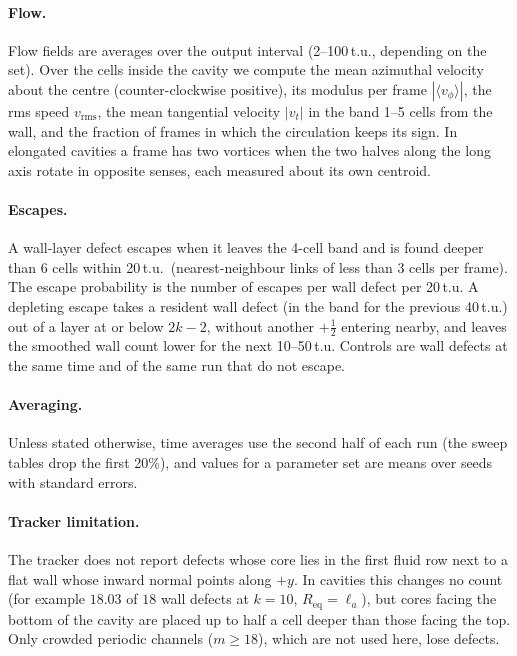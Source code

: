 \documentclass[aps,prl,onecolumn,superscriptaddress,amsmath,amssymb,nofootinbib]{revtex4-2}
\newcommand{\half}{\tfrac12}
\newcommand{\la}{\ell_a}
\begin{document}
\paragraph{Flow.} Flow fields are averages over the output interval (2--100\,t.u., depending on the set). Over the cells inside the cavity we compute the mean
azimuthal velocity about the centre (counter-clockwise positive), its modulus per frame $|\langle v_\phi\rangle|$, the rms speed $v_\mathrm{rms}$, the mean
tangential velocity $|v_t|$ in the band 1--5 cells from the wall, and the fraction of frames in which the circulation keeps its sign. In elongated cavities a frame
has two vortices when the two halves along the long axis rotate in opposite senses, each measured about its own centroid.

\paragraph{Escapes.} A wall-layer defect escapes when it leaves the 4-cell band and is found deeper than 6 cells within 20\,t.u.\ (nearest-neighbour links of less
than 3 cells per frame). The escape probability is the number of escapes per wall defect per 20\,t.u. A depleting escape takes a resident wall defect (in the band for the previous 40\,t.u.) out of a layer at or below
$2k-2$, without another $+\half$ entering nearby, and leaves the smoothed wall count lower for the next 10--50\,t.u. Controls are wall defects at the same time and of the same run that do not escape.

\paragraph{Averaging.} Unless stated otherwise, time averages use the second half of each run (the sweep tables drop the first 20\%), and values for a parameter set
are means over seeds with standard errors.

\paragraph{Tracker limitation.} The tracker does not report defects whose core lies in the first fluid row next to a flat wall whose inward normal points along $+y$.
In cavities this changes no count (for example $18.03$ of $18$ wall defects at $k=10$, $R_\mathrm{eq}=\la$), but cores facing the bottom of the cavity are placed up to
half a cell deeper than those facing the top. Only crowded periodic channels ($m\geq18$), which are not used here, lose defects.
\end{document}
